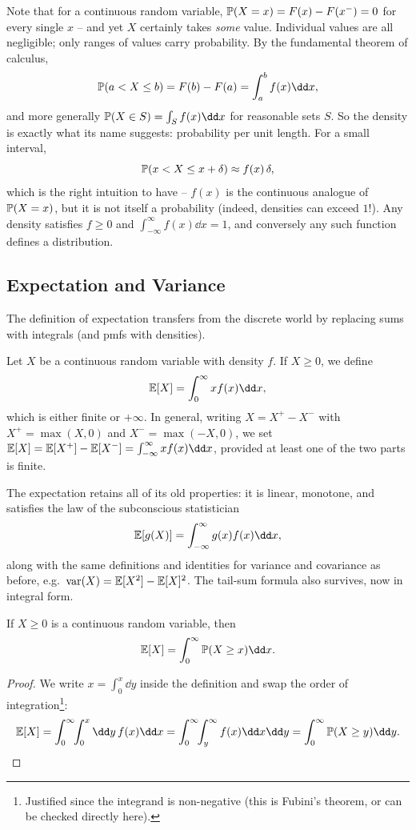 \documentclass[a4paper]{scrartcl}
\begin{document}
Note that for a continuous random variable, $\mathbb{P}(X = x) = F(x) - F(x^-) = 0$ for every single $x$ -- and yet $X$ certainly takes \emph{some} value. Individual values are all negligible; only ranges of values carry probability. By the fundamental theorem of calculus,
$$
\PP(a < X \leq b) = F(b) - F(a) = \int_a^b f(x) \dd x,
$$
and more generally $\PP(X \in S) = \int_S f(x)\dd x$ for reasonable sets $S$. So the density is exactly what its name suggests: probability per unit length. For a small interval,
$$
\mathbb{P}(x < X \leq x + \delta) \approx f(x)\,\delta,
$$
which is the right intuition to have -- $f(x)$ is the continuous analogue of $\mathbb{P}(X = x)$, but it is not itself a probability (indeed, densities can exceed $1$!). Any density satisfies $f \geq 0$ and $\int_{-\infty}^{\infty} f(x)\dd x = 1$, and conversely any such function defines a distribution.

\subsection{Expectation and Variance}

The definition of expectation transfers from the discrete world by replacing sums with integrals (and pmfs with densities).

\begin{definition}[Expectation]
	Let $X$ be a continuous random variable with density $f$. If $X \geq 0$, we define
	$$
	\EE[X] = \int_0^{\infty} x f(x) \dd x,
	$$
	which is either finite or $+\infty$. In general, writing $X = X^+ - X^-$ with $X^+ = \max(X, 0)$ and $X^- = \max(-X, 0)$, we set $\EE[X] = \EE[X^+] - \EE[X^-] = \int_{-\infty}^{\infty} xf(x)\dd x$, provided at least one of the two parts is finite.
	\end{definition}

The expectation retains all of its old properties: it is linear, monotone, and satisfies the law of the subconscious statistician
$$
\EE[g(X)] = \int_{-\infty}^{\infty} g(x)f(x)\dd x,
$$
along with the same definitions and identities for variance and covariance as before, e.g.\ $\operatorname{var}(X) = \mathbb{E}[X^2] - \mathbb{E}[X]^2$. The tail-sum formula also survives, now in integral form.

\begin{proposition}
	If $X \geq 0$ is a continuous random variable, then
	$$
	\EE[X] = \int_0^{\infty} \PP(X \geq x) \dd x.
	$$
\end{proposition}
\begin{proof}
	We write $x = \int_0^x \dd y$ inside the definition and swap the order of integration\footnote{Justified since the integrand is non-negative (this is Fubini's theorem, or can be checked directly here).}:
	$$
	\EE[X] = \int_0^{\infty}\!\! \int_0^x \dd y \, f(x)\dd x = \int_0^{\infty}\!\! \int_y^{\infty} f(x)\dd x \dd y = \int_0^{\infty} \PP(X \geq y)\dd y. \qedhere
	$$
\end{proof}
\end{document}
